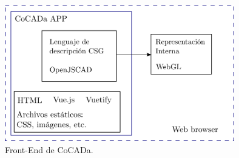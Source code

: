 \begin{figure}[h]
    \includegraphics[width=10cm]{Img/Desarrollo/front.png}
    \centering
    \caption{\footnotesize{Front-End de CoCADa. 
    }}
    \label{fig:front}
\end{figure}

